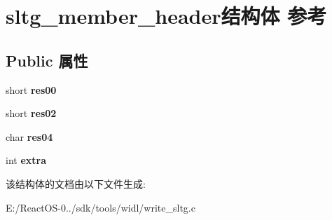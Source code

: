 \hypertarget{structsltg__member__header}{}\section{sltg\+\_\+member\+\_\+header结构体 参考}
\label{structsltg__member__header}
\subsection*{Public 属性}
\begin{DoxyCompactItemize}
\item 
\mbox{\label{structsltg__member__header_a00353029fae9edfcc6009389e798231d}} 
short {\bfseries res00}
\item 
\mbox{\label{structsltg__member__header_a7254c80a1c7a28fe8b4ea11dedd203e1}} 
short {\bfseries res02}
\item 
\mbox{\label{structsltg__member__header_a61a3dc9ea1c1fddda0ddc3eadb9c7fbe}} 
char {\bfseries res04}
\item 
\mbox{\label{structsltg__member__header_a379a8fc82788d297ef72263f89a96170}} 
int {\bfseries extra}
\end{DoxyCompactItemize}


该结构体的文档由以下文件生成\+:\begin{DoxyCompactItemize}
\item 
E\+:/\+React\+O\+S-\/0../sdk/tools/widl/write\+\_\+sltg.\+c\end{DoxyCompactItemize}

